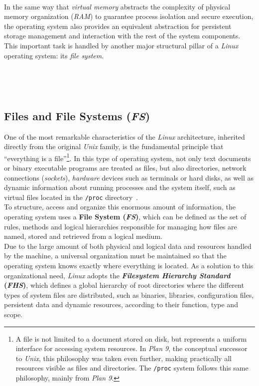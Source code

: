 \

In the same way that \textit{virtual memory} abstracts the complexity of physical memory organization (\textit{RAM}) to guarantee process isolation and secure execution,
the operating system also provides an equivalent abstraction for persistent storage management and interaction with the rest of the system components.
This important task is handled by another major structural pillar of a \textit{Linux} operating system: its \textit{file system}.

\

\

\subsection{Files and File Systems (\textit{FS})}
\label{sec:fs}

One of the most remarkable characteristics of the \textit{Linux} architecture, inherited directly from the original \textit{Unix} family, is the fundamental principle that ``everything is a file''\footnote{A file is not limited to a document stored on disk, but represents a uniform interface for accessing system resources. In \textit{Plan 9}, the conceptual successor to \textit{Unix}, this philosophy was taken even further, making practically all resources visible as files and directories. The \texttt{/proc} system follows this same philosophy, mainly from \textit{Plan 9}.}.
In this type of operating system, not only text documents or binary executable programs are treated as files, but also directories, network connections (\textit{sockets}), \textit{hardware} devices such as terminals or hard disks,
as well as dynamic information about running processes and the system itself, such as virtual files located in the \texttt{/proc} directory~\cite{love_linux}.\\

To structure, access and organize this enormous amount of information, the operating system uses a \textbf{File System (\textit{FS})}, which can be defined as the set of rules, methods and logical hierarchies responsible for managing how files are named, stored and retrieved from a logical medium.\\

Due to the large amount of both physical and logical data and resources handled by the machine, a universal organization must be maintained so that the operating system knows exactly where everything is located.
As a solution to this organizational need, \textit{Linux} adopts the \textbf{\textit{Filesystem Hierarchy Standard} (\textit{FHS})}, which defines a global hierarchy of root directories where the different types of system files are distributed, such as binaries, libraries, configuration files, persistent data and dynamic resources, according to their function, type and scope.\\

